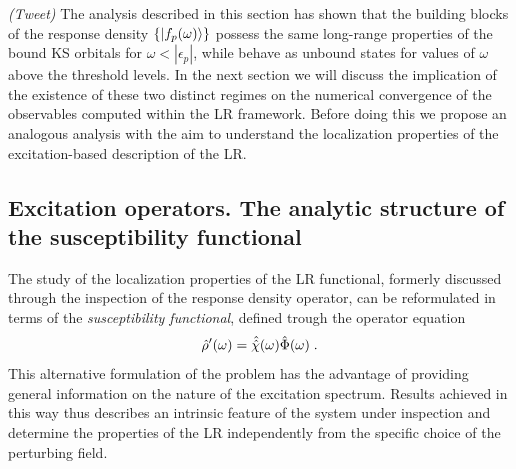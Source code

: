 \documentclass[reprint,aps,prb]{revtex4-1}
\newcommand{\eps}{\epsilon}
\newcommand{\be}{\begin{equation}}
\newcommand{\ee}{\end{equation}}
\newcommand{\lb}{\label}
\newcommand{\op}[1]{\hat {#1}}
\newcommand{\sop}[1]{\op{\op {#1}}}
\newcommand{\dm}{\op{\rho}}
\begin{document}
\emph{(Tweet)} The analysis described in this section has shown that the building blocks of the response density $\{\ket{f_p(\omega)}\}$ possess the same long-range properties of the bound KS
orbitals for $\omega < |\eps_p|$, while behave as unbound states for values of $\omega$ above the threshold levels. In the next section we will discuss the implication of the existence of these
two distinct regimes on the numerical convergence of the observables computed within the LR framework. Before doing this we propose an analogous analysis with the aim to understand the localization 
properties of the excitation-based description of the LR.


\subsection{Excitation operators. The analytic structure of the susceptibility functional}

The study of the localization properties of the LR functional, formerly discussed through the inspection of the response density operator, can be reformulated in terms of the 
\emph{susceptibility functional}, defined trough the operator equation  
\be\lb{SusceptibilityDef1}
\dm'(\omega) = \sop{{\cal \chi}}(\omega) \op\Phi(\omega) \;. 
\ee
This alternative formulation of the problem has the advantage of providing general information on the nature of the excitation spectrum. Results achieved in this way thus describes an intrinsic 
feature of the system under inspection and determine the properties of the LR independently from the specific choice of the perturbing field. 
\end{document}
